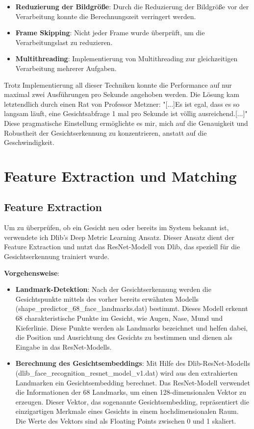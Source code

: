 \begin{itemize}
    \item \textbf{Reduzierung der Bildgröße}: Durch die Reduzierung der Bildgröße vor der Verarbeitung konnte die Berechnungszeit verringert werden.
    \item \textbf{Frame Skipping}: Nicht jeder Frame wurde überprüft, um die Verarbeitungslast zu reduzieren.
    \item \textbf{Multithreading}: Implementierung von Multithreading zur gleichzeitigen Verarbeitung mehrerer Aufgaben.
\end{itemize}

Trotz Implementierung all dieser Techniken konnte die Performance auf nur maximal zwei Ausführungen pro Sekunde angehoben werden. Die Lösung kam letztendlich durch einen Rat von Professor Metzner: "[...]Es ist egal, dass es so langsam läuft, eine Gesichtsabfrage 1 mal pro Sekunde ist völlig ausreichend.[...]" Diese pragmatische Einstellung ermöglichte es mir, mich auf die Genauigkeit und Robustheit der Gesichtserkennung zu konzentrieren, anstatt auf die Geschwindigkeit.


\section{Feature Extraction und Matching}

\subsection{Feature Extraction}
Um zu überprüfen, ob ein Gesicht neu oder bereits im System bekannt ist, verwendete ich Dlib's Deep Metric Learning Ansatz. Dieser Ansatz dient der Feature Extraction und nutzt das ResNet-Modell von Dlib, das speziell für die Gesichtserkennung trainiert wurde.

\textbf{Vorgehensweise}:
\begin{itemize}
    \item \textbf{Landmark-Detektion}: Nach der Gesichtserkennung werden die Gesichtspunkte mittels des vorher bereits erwähnten Modells (shape\_predictor\_68\_face\_landmarks.dat) bestimmt. Dieses Modell erkennt 68 charakteristische Punkte im Gesicht, wie Augen, Nase, Mund und Kieferlinie. Diese Punkte werden als Landmarks bezeichnet und helfen dabei, die Position und Ausrichtung des Gesichts zu bestimmen und dienen als Eingabe in das ResNet-Modells.
    
    \item \textbf{Berechnung des Gesichtsembeddings}: Mit Hilfe des Dlib-ResNet-Modells (dlib\_face\_recognition\_resnet\_model\_v1.dat) wird aus den extrahierten Landmarken ein Gesichtsembedding berechnet. Das ResNet-Modell verwendet die Informationen der 68 Landmarks, um einen 128-dimensionalen Vektor zu erzeugen. Dieser Vektor, das sogenannte Gesichtsembedding, repräsentiert die einzigartigen Merkmale eines Gesichts in einem hochdimensionalen Raum. Die Werte des Vektors sind als Floating Points zwischen 0 und 1 skaliert.
\end{itemize}


